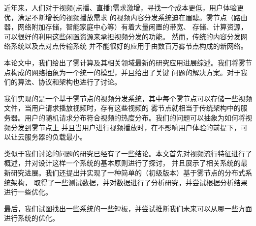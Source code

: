 \begin{cnabstract}
近年来，人们对于视频(点播、直播)需求激增，寻找一个成本更低，用户体验更优，满足不断增长的视频播放需求
的视频内容分发系统迫在眉睫。雾节点（路由器，网络附加存储，智能家庭中心等）有着大量闲置的带宽、
存储、计算资源，可以很好的利用这些闲置资源来承担视频分发的功能。
然而，传统的内容分发网络系统以及点对点传输系统
并不能很好的应用于由数百万雾节点构成的新网络。

本论文中，我们给出了雾计算及其相关领域最新的研究应用进展综述。我们将雾节点构成的网络抽象为一个统一的模型，并且给出了关键
问题的解决方案。对于我们的算法、协议和架构也进行了讨论。

我们实现的是一个基于雾节点的视频分发系统，其中每个雾节点可以存储一些视频文件，当用户请求播放视频时，存有这些视频的
雾节点就相当于传统架构中的服务器。用户的随机请求分布符合视频的热度分布。我们的问题可以抽象为如何将视频分发到雾节点上
并且当用户进行视频播放时，在不影响用户体验的前提下，可以让云服务器的负载最小。

类似于我们讨论的问题的研究已经有了一些结论。本文首先对视频流行特征进行了概述，并对设计这样一个系统的基本原则进行了探讨，
并且展示了相关系统的最新研究进展。我们还提出并实现了一种简单的（初级版本）基于雾节点的分布式系统架构，
取得了一些测试数据，并对数据进行了分析研究，并尝试根据分析结果进行一些优化。

最后，我们试图找出一些系统的一些短板，并尝试推断我们未来可以从哪一些方面进行系统的优化。

\end{cnabstract}

